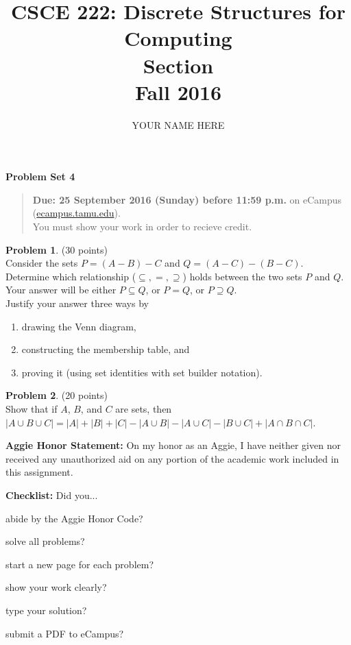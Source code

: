 \documentclass{article}
\title{CSCE 222: Discrete Structures for Computing\\Section \mysectionnumber\\Fall 2016}
\author{YOUR NAME HERE}
\theoremstyle{definition}
\newtheorem{problem}{Problem}
\newtheorem*{solution}{Solution}
\newcommand{\honor}{\noindent \textbf{Aggie Honor Statement: }On my honor as an Aggie, I have neither
  given nor received any unauthorized aid on any portion of the academic work included in this assignment.
}
\newcommand{\checklist}{\noindent\textbf{Checklist:}
Did you...
\begin{compactenum}
\item abide by the Aggie Honor Code?
\item solve all problems?
\item start a new page for each problem?
\item show your work clearly?
\item type your solution?
\item submit a PDF to eCampus?
\end{compactenum}
}
\newcommand{\problemset}[1]{\begin{center}\textbf{Problem Set #1}\end{center}}
\newcommand{\duedate}[1]{\begin{quote}\textbf{Due: #1} on eCampus (\url{ecampus.tamu.edu}). \\You must show your work in order to recieve credit.\end{quote}}
\begin{document}
\maketitle

\problemset{4}

\duedate{25 September 2016 (Sunday) before 11:59 p.m.}

\bigskip

\begin{problem} (30 points)\\
Consider the sets $P = (A-B)-C$ and $Q = (A-C) - (B-C)$.\\
Determine which relationship ($\subseteq,=,\supseteq$) holds between the two sets $P$ and $Q$.\\
Your answer will be either $P \subseteq Q$, or $P = Q$, or $P \supseteq Q$.\\
Justify your answer three ways by
\begin{enumerate}
\item drawing the Venn diagram,
\item constructing the membership table, and
\item proving it (using set identities with set builder notation).
\end{enumerate}
\end{problem}



\begin{problem} (20 points)\\
Show that if $A$, $B$, and $C$ are sets, then $|A \cup B \cup C| = |A| + |B| + |C| - |A \cup B| - |A \cup C| - |B \cup C| + |A \cap B \cap C|$.
\end{problem}


\bigskip
\honor

\bigskip
\checklist
\end{document}
